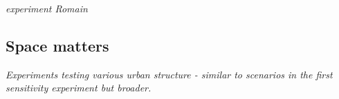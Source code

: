 \textit{experiment Romain}



\subsection{Space matters}

\textit{Experiments testing various urban structure - similar to scenarios in the first sensitivity experiment but broader.}










